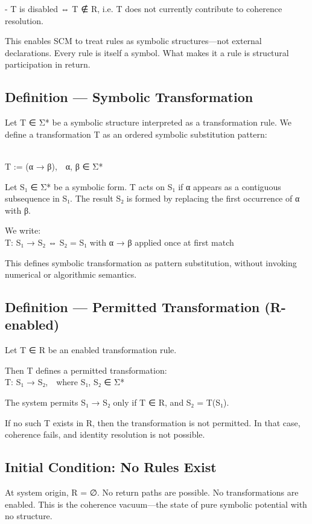 - T is disabled ⇔ T ∉ R, i.e. T does not currently contribute to
coherence resolution.

This enables SCM to treat rules as symbolic structures---not external
declarations. Every rule is itself a symbol. What makes it a rule is
structural participation in return.

\subsection{Definition --- Symbolic
Transformation}\label{definition-symbolic-transformation}

Let T ∈ Σ* be a symbolic structure interpreted as a transformation rule.
We define a transformation T as an ordered symbolic substitution
pattern:\\
\strut \\
T := (α → β), α, β ∈ Σ*

Let S₁ ∈ Σ* be a symbolic form. T acts on S₁ if α appears as a
contiguous subsequence in S₁. The result S₂ is formed by replacing the
first occurrence of α with β.

We write:\\
T: S₁ → S₂ ⇔ S₂ = S₁ with α → β applied once at first match

This defines symbolic transformation as pattern substitution, without
invoking numerical or algorithmic semantics.

\subsection{Definition --- Permitted Transformation
(R-enabled)}\label{definition-permitted-transformation-r-enabled}

Let T ∈ R be an enabled transformation rule.

Then T defines a permitted transformation:\\
T: S₁ → S₂, where S₁, S₂ ∈ Σ*

The system permits S₁ → S₂ only if T ∈ R, and S₂ = T(S₁).

If no such T exists in R, then the transformation is not permitted. In
that case, coherence fails, and identity resolution is not possible.

\subsection{Initial Condition: No Rules
Exist}\label{initial-condition-no-rules-exist}

At system origin, R = ∅. No return paths are possible. No
transformations are enabled. This is the coherence vacuum---the state of
pure symbolic potential with no structure.


